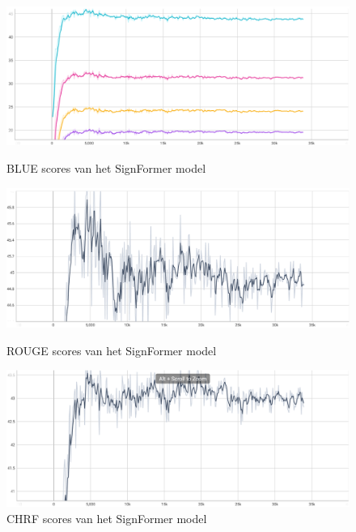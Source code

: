 \begin{figure}[p!] %
    \centering %

    \includegraphics[width=1\textwidth]{../graphics/BlueScoresTraining.png}
    \caption{BLUE scores van het SignFormer model}
    \label{fig:blue-scores}

    \vspace{1cm}

    \includegraphics[width=1\textwidth]{../graphics/RougeScore.png}
    \caption{ROUGE scores van het SignFormer model}
    \label{fig:rouge-scores}

    \vspace{1cm} 

    \includegraphics[width=1\textwidth]{../graphics/CHRF.png}
    \caption{CHRF scores van het SignFormer model}
    \label{fig:chrf-scores}
\end{figure}
